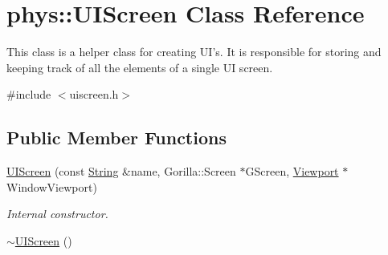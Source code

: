 \hypertarget{classphys_1_1UIScreen}{
\section{phys::UIScreen Class Reference}
\label{d9/de8/classphys_1_1UIScreen}
}


This class is a helper class for creating UI's. It is responsible for storing and keeping track of all the elements of a single UI screen.  




{\ttfamily \#include $<$uiscreen.h$>$}

\subsection*{Public Member Functions}
\begin{DoxyCompactItemize}
\item 
\hyperlink{classphys_1_1UIScreen_a1075b96ce6edcc071080f362df507530}{UIScreen} (const \hyperlink{namespacephys_aa03900411993de7fbfec4789bc1d392e}{String} \&name, Gorilla::Screen $\ast$GScreen, \hyperlink{classphys_1_1Viewport}{Viewport} $\ast$WindowViewport)
\begin{DoxyCompactList}\small\item\em Internal constructor. \item\end{DoxyCompactList}\item 
\hypertarget{classphys_1_1UIScreen_a5b8d4ebcffefeac1b39b6dac5a51b650}{
\hyperlink{classphys_1_1UIScreen_a5b8d4ebcffefeac1b39b6dac5a51b650}{$\sim$UIScreen} ()}
\label{d9/de8/classphys_1_1UIScreen_a5b8d4ebcffefeac1b39b6dac5a51b650}


\end{DoxyCompactItemize}
